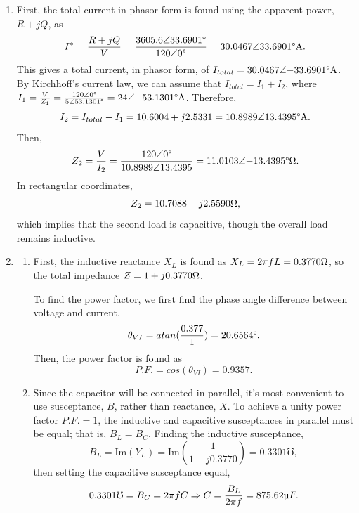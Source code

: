 \documentclass{article}
\begin{document}
\begin{enumerate}
\begin{enumerate}[label=\alph*)]
\[				I = \frac{V}{Z} = \frac{120\angle{30\degree}\text{V}}{26.4025\angle{82.3823\degree}\ohm} = 4.5450\angle{-52.3823\degree}\text{A}.
			\]
			\item
				The load power factor is then found by recalculating the real and apparent power and finding the ratio between them, \[
					P.F. = \frac{P_{real}}{P_{apparent}} = \frac{72.2966\text{W}}{545.4\text{VA}} = 0.1326
				\]
			  \item Real power is given in part (b) as \[
						P_{real} = 79.2966\text{W}.
			  \]
			  \item Reactive power is \[
						P_{reactive} = P_{apparent}sin(\theta_{IV}) = 540.5836\text{VAR}.
			  \] 
	  \end{enumerate}
	\item First, the total current in phasor form is found using the apparent power, \(R + jQ\), as \[
		I^{*} = \frac{R+jQ}{V} = \frac{3605.6\angle{33.6901\degree}}{120\angle{0\degree}} = 30.0467\angle{33.6901\degree}\text{A}. 
	\]
	This gives a total current, in phasor form, of \(I_{total} = 30.0467\angle{-33.6901\degree}\text{A}\). By Kirchhoff's current law, we can assume that \(I_{total} = I_{1} + I_{2}\), where \(I_{1} = \frac{V}{Z_{1}} = \frac{120\angle{0\degree}}{5\angle{53.1301\degree}} = 24\angle{-53.1301\degree}\text{A}\). Therefore, \[
		I_{2} = I_{total} - I_{1} = 10.6004 + j2.5331 = 10.8989\angle{13.4395\degree}\text{A}.
	\]
	Then, \[
		Z_{2} = \frac{V}{I_{2}} = \frac{120\angle{0\degree}}{10.8989\angle{13.4395}} = 11.0103\angle{-13.4395\degree}\ohm.
	\]
	In rectangular coordinates, \[
		Z_{2} = 10.7088 - j2.5590\ohm,
	\]
	which implies that the second load is capacitive, though the overall load remains inductive.
  \item 
    \begin{enumerate}[label=\alph*)]
			\item First, the inductive reactance \(X_{L}\) is found as \(X_{L} = 2\pi fL = 0.3770 \ohm\), so the total impedance \(Z = 1 + j0.3770 \ohm\).

		To find the power factor, we first find the phase angle difference between voltage and current, \[
			\theta_{VI} = atan(\frac{0.377}{1}) = 20.6564\degree.
		\]
		Then, the power factor is found as \[
			P.F. = cos(\theta_{VI}) = 0.9357.
		\]
	  \item Since the capacitor will be connected in parallel, it's most convenient to use susceptance, \(B\), rather than reactance, \(X\).	To achieve a unity power factor \(P.F. = 1\), the inductive and capacitive susceptances in parallel must be equal; that is, \(B_L = B_C\). Finding the inductive susceptance, \[
				B_L = \text{Im}(Y_L) = \text{Im}(\frac{1}{1+j0.3770}) = 0.3301 \mho,
	  \]then setting the capacitive susceptance equal, \[
		0.3301\mho = B_C = 2\pi f C \Rightarrow C = \frac{B_L}{2\pi f} = 875.62\micro F.
	  \]
	  \end{enumerate}
  \end{enumerate}
\end{document}
